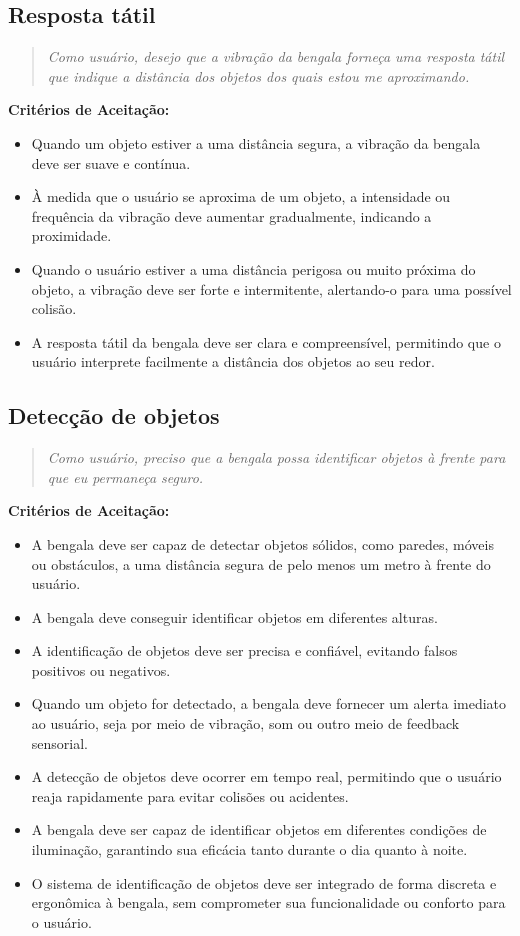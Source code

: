     \subsection{Resposta tátil}
    \begin{quote}
    \textit{Como usuário, desejo que a vibração da bengala forneça uma resposta tátil que indique a distância dos objetos dos quais estou me aproximando.}
    \end{quote}    
    \noindent\textbf{Critérios de Aceitação:}
    \begin{itemize}
        \item Quando um objeto estiver a uma distância segura, a vibração da bengala deve ser suave e contínua.
        \item À medida que o usuário se aproxima de um objeto, a intensidade ou frequência da vibração deve aumentar gradualmente, indicando a proximidade.
        \item Quando o usuário estiver a uma distância perigosa ou muito próxima do objeto, a vibração deve ser forte e intermitente, alertando-o para uma possível colisão.
        \item A resposta tátil da bengala deve ser clara e compreensível, permitindo que o usuário interprete facilmente a distância dos objetos ao seu redor.
    \end{itemize}
        
    \subsection{Detecção de objetos}
    \begin{quote}
    \textit{Como usuário, preciso que a bengala possa identificar objetos à frente para que eu permaneça seguro.}
    \end{quote}    
    \noindent\textbf{Critérios de Aceitação:}
    \begin{itemize}
        \item A bengala deve ser capaz de detectar objetos sólidos, como paredes, móveis ou obstáculos, a uma distância segura de pelo menos um metro à frente do usuário.
        \item A bengala deve conseguir identificar objetos em diferentes alturas.
        \item A identificação de objetos deve ser precisa e confiável, evitando falsos positivos ou negativos.
        \item Quando um objeto for detectado, a bengala deve fornecer um alerta imediato ao usuário, seja por meio de vibração, som ou outro meio de feedback sensorial.
        \item A detecção de objetos deve ocorrer em tempo real, permitindo que o usuário reaja rapidamente para evitar colisões ou acidentes.
        \item A bengala deve ser capaz de identificar objetos em diferentes condições de iluminação, garantindo sua eficácia tanto durante o dia quanto à noite.
        \item O sistema de identificação de objetos deve ser integrado de forma discreta e ergonômica à bengala, sem comprometer sua funcionalidade ou conforto para o usuário.
    \end{itemize}

